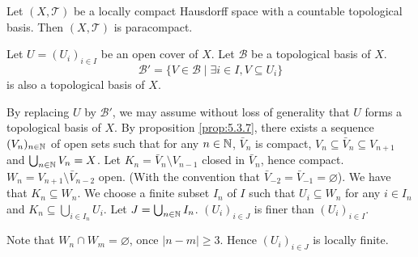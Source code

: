 \begin{theoremenv}\label{thm:7.6.2}
    Let $(X,\mathscr{T})$ be a locally compact Hausdorff space with a countable topological basis.
    Then $(X,\mathscr{T})$ is paracompact.
\end{theoremenv}
\begin{proofenv}
    Let $U = (U_i)_{i \in I}$ be an open cover of $X$.
    Let $\mathcal{B}$ be a topological basis of $X$.
    $$\mathcal{B}' = \{V \in \mathcal{B} \mid \exists i \in I, V \subseteq U_i\}$$
    is also a topological basis of $X$.

    \quad By replacing $U$ by $\mathcal{B}'$, we may assume without loss of generality that $U$ forms a topological basis of $X$.
    By proposition \ref{prop:5.3.7}, there exists a sequence $(V_n)_{n \in \mathbb{N}}$ of open sets such that for any $n \in \mathbb{N}$, $\bar{V}_n$ is compact,
    $V_n \subseteq \bar{V}_n \subseteq V_{n+1}$ and $\bigcup_{n \in \mathbb{N}} V_n = X$.
    Let $K_n = \bar{V}_n \setminus V_{n-1}$ closed in $\bar{V}_n$, hence compact.
    $W_n = V_{n + 1} \setminus \bar{V}_{n-2}$ open. (With the convention that $\bar{V}_{-2} = \bar{V}_{-1} = \varnothing$).
    We have that $K_n \subseteq W_n$.
    We choose a finite subset $I_n$ of $I$ such that $U_i \subseteq W_n$ for any $i \in I_n$ and $K_n \subseteq \bigcup_{i \in I_n} U_i$.
    Let $J = \bigcup_{n \in \mathbb{N}} I_n$.
    $(U_i)_{i \in J}$ is finer than $(U_i)_{i \in I}$.
    
    \quad Note that $W_n \cap W_m = \varnothing$, once $|n-m| \ge 3$.
    Hence $(U_i)_{i \in J}$ is locally finite.
\end{proofenv}

